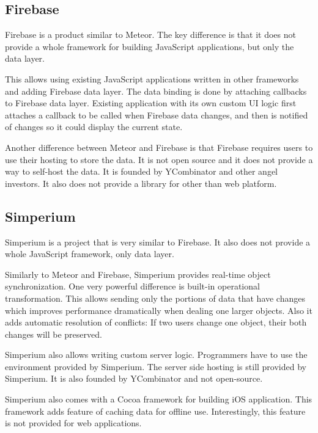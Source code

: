 \subsection{Firebase}

Firebase \citep{firebase} is a product similar to Meteor. The key difference is that it does not provide a whole framework for building JavaScript applications, but only the data layer.

This allows using existing JavaScript applications written in other frameworks and adding Firebase data layer. The data binding is done by attaching callbacks to Firebase data layer. Existing application with its own custom UI logic first attaches a callback to be called when Firebase data changes, and then is notified of changes so it could display the current state.

Another difference between Meteor and Firebase is that Firebase requires users to use their hosting to store the data. It is not open source and it does not provide a way to self-host the data. It is founded by YCombinator \citep{ycombinator} and other angel investors. It also does not provide a library for other than web platform.

\subsection{Simperium}

Simperium is a project that is very similar to Firebase. It also does not provide a whole JavaScript framework, only data layer.

Similarly to Meteor and Firebase, Simperium provides real-time object synchronization. One very powerful difference is built-in operational transformation. \citep{ot} This allows sending only the portions of data that have changes which improves performance dramatically when dealing one larger objects. Also it adds automatic resolution of conflicts: If two users change one object, their both changes will be preserved.

Simperium also allows writing custom server logic. Programmers have to use the environment provided by Simperium. The server side hosting is still provided by Simperium. It is also founded by YCombinator \citep{ycombinator} and not open-source. 

Simperium also comes with a Cocoa framework for building iOS application. This framework adds feature of caching data for offline use. Interestingly, this feature is not provided for web applications.

